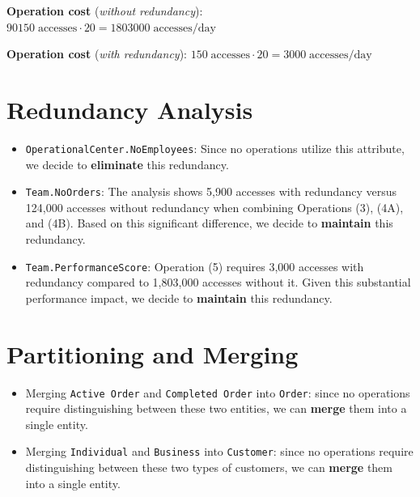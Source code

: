     \textbf{Operation cost} (\textit{without redundancy}): $90150 \; \text{accesses} \cdot 20 = 1803000 \; \text{accesses/day}$

    \textbf{Operation cost} (\textit{with redundancy}): $150 \; \text{accesses} \cdot 20 = 3000 \; \text{accesses/day}$  

    

\section*{Redundancy Analysis}
\begin{itemize}[label=-]
\item \texttt{OperationalCenter.NoEmployees}: Since no operations utilize this attribute, we decide to \textbf{eliminate} this redundancy.
\item \texttt{Team.NoOrders}: The analysis shows 5,900 accesses with redundancy versus 124,000 accesses without redundancy when combining Operations (3), (4A), and (4B). Based on this significant difference, we decide to \textbf{maintain} this redundancy.
\item \texttt{Team.PerformanceScore}: Operation (5) requires 3,000 accesses with redundancy compared to 1,803,000 accesses without it. Given this substantial performance impact, we decide to \textbf{maintain} this redundancy.
\end{itemize}


\section*{Partitioning and Merging}
\begin{itemize}[label=-]
    \item Merging \texttt{Active Order} and \texttt{Completed Order} into \texttt{Order}: since no operations require distinguishing between these two entities, we can \textbf{merge} them into a single entity.
    \item Merging \texttt{Individual} and \texttt{Business} into \texttt{Customer}: since no operations require distinguishing between these two types of customers, we can \textbf{merge} them into a single entity.
\end{itemize}

